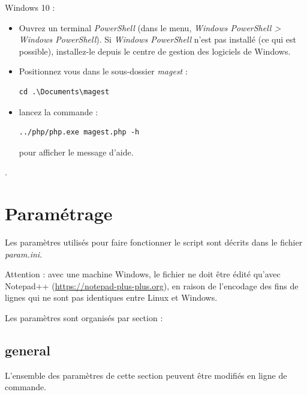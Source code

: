 \documentclass[12pt,a4paper]{article}
\begin{document}
Windows 10 :
\begin{itemize}
\item Ouvrez un terminal \textit{PowerShell} (dans le menu, \textit{Windows PowerShell > Windows PowerShell}). Si \textit{Windows PowerShell} n'est pas installé (ce qui est possible), installez-le depuis le centre de gestion des logiciels de Windows.
\item Positionnez vous dans le sous-dossier \textit{magest} :
\begin{lstlisting}
cd .\Documents\magest
\end{lstlisting}
\item lancez la commande :
\begin{lstlisting}
../php/php.exe magest.php -h
\end{lstlisting}
pour afficher le message d'aide.
\end{itemize}
. 

\section{Paramétrage}
Les paramètres utilisés pour faire fonctionner le script sont décrits dans le fichier \textit{param.ini}.

Attention : avec une machine Windows, le fichier ne doit être édité qu'avec Notepad++ (\url{https://notepad-plus-plus.org}), en raison de l'encodage des fins de lignes qui ne sont pas identiques entre Linux et Windows.

Les paramètres sont organisés par section :

\subsection{general}
L'ensemble des paramètres de cette section peuvent être modifiés en ligne de commande.
\end{document}
